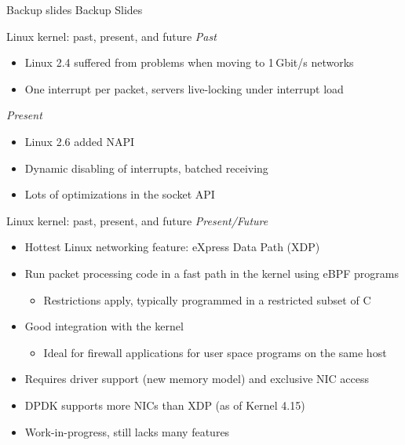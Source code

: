 \documentclass[NET,english,aspectratio=169,notitleframe]{tumbeamer}
\begin{document}
\begin{frame}{Backup slides}
\vfill
\centering \huge Backup Slides
\vfill
\end{frame}

\begin{frame}{Linux kernel: past, present, and future}
\emph{Past}
\begin{itemize}
\item Linux 2.4 suffered from problems when moving to 1\,Gbit/s networks
\item One interrupt per packet, servers live-locking under interrupt load
\end{itemize}
\emph{Present}
\begin{itemize}
\item Linux 2.6 added NAPI
\item Dynamic disabling of interrupts, batched receiving
\item Lots of optimizations in the socket API
\end{itemize}
\end{frame}

\begin{frame}{Linux kernel: past, present, and future}
\emph{Present/Future}
\begin{itemize}
\item Hottest Linux networking feature: eXpress Data Path (XDP)
\item Run packet processing code in a fast path in the kernel using eBPF programs
\begin{itemize}
\item Restrictions apply, typically programmed in a restricted subset of C
\end{itemize}
\item Good integration with the kernel
\begin{itemize}
\item Ideal for firewall applications for user space programs on the same host
\end{itemize}
\item<2-> Requires driver support (new memory model) and exclusive NIC access
\item<2-> DPDK supports more NICs than XDP (as of Kernel 4.15)
\item<2-> Work-in-progress, still lacks many features
\end{itemize}
\end{frame}
\end{document}
